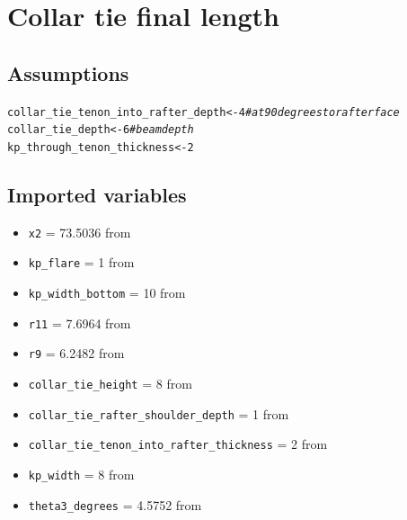 \documentclass{article}\usepackage[]{graphicx}\usepackage[]{xcolor}
\makeatletter
\newcommand{\hlnum}[1]{\textcolor[rgb]{0.686,0.059,0.569}{#1}}%
\newcommand{\hlcom}[1]{\textcolor[rgb]{0.678,0.584,0.686}{\textit{#1}}}%
\newcommand{\hlstd}[1]{\textcolor[rgb]{0.345,0.345,0.345}{#1}}%
\newcommand{\hlkwb}[1]{\textcolor[rgb]{0.69,0.353,0.396}{#1}}%
\newenvironment{kframe}{%
 \def\at@end@of@kframe{}%
 \ifinner\ifhmode%
  \def\at@end@of@kframe{\end{minipage}}%
  \begin{minipage}{\columnwidth}%
 \fi\fi%
 \def\FrameCommand##1{\hskip\@totalleftmargin \hskip-\fboxsep
 \colorbox{shadecolor}{##1}\hskip-\fboxsep
     \hskip-\linewidth \hskip-\@totalleftmargin \hskip\columnwidth}%
 \MakeFramed {\advance\hsize-\width
   \@totalleftmargin\z@ \linewidth\hsize
   \@setminipage}}%
 {\par\unskip\endMakeFramed%
 \at@end@of@kframe}
\newenvironment{knitrout}{}{} %
\makeatother
\begin{document}
\section{Collar tie final length}\label{collar-tie-final-length}

\subsection{Assumptions}
\begin{knitrout}
\color{fgcolor}\begin{kframe}
\begin{alltt}
\hlstd{collar_tie_tenon_into_rafter_depth} \hlkwb{<-} \hlnum{4} \hlcom{# at 90 degrees to rafter face}
\hlstd{collar_tie_depth} \hlkwb{<-} \hlnum{6} \hlcom{# beam depth}
\hlstd{kp_through_tenon_thickness} \hlkwb{<-} \hlnum{2}
\end{alltt}
\end{kframe}
\end{knitrout}

\subsection{Imported variables}
\begin{itemize}
  \item \verb+x2+ = 73.5036 from 
  \item \verb+kp_flare+ = 1 from 
  \item \verb+kp_width_bottom+ = 10 from 
  \item \verb+r11+ = 7.6964 from 
  \item \verb+r9+ = 6.2482 from 
  \item \verb+collar_tie_height+ = 8 from 
  \item \verb+collar_tie_rafter_shoulder_depth+ = 1 from 
  \item \verb+collar_tie_tenon_into_rafter_thickness+ = 2 from 
  \item \verb+kp_width+ = 8 from 
  \item \verb+theta3_degrees+ = 4.5752 from 
\end{itemize}
\end{document}
